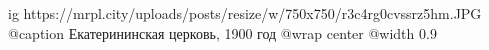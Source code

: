  
 
 
 
 

\ifcmt
  ig https://mrpl.city/uploads/posts/resize/w/750x750/r3c4rg0cvssrz5hm.JPG
	@caption Екатерининская церковь, 1900 год
  @wrap center
  @width 0.9
\fi
